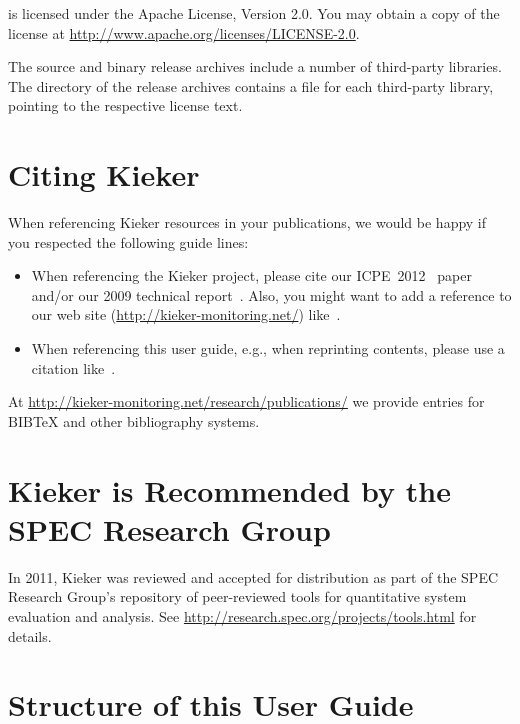 \Kieker{} is licensed under the Apache License, Version 2.0. You may obtain a copy of %
the license at \url{http://www.apache.org/licenses/LICENSE-2.0}.

The \Kieker{} source and binary release archives include a number of third-party %
libraries. %
The  directory of the release archives contains a %
 file for each third-party library, pointing to the respective license text.

\section{Citing Kieker}\label{sec:ch1:citingKieker}

When referencing Kieker resources in your publications, we would be happy if you %
respected the following guide lines:

\begin{itemize}
\item When referencing the Kieker project, please cite our %
ICPE~2012~\cite{KiekerICPE2012} paper and/or our 2009 technical report~\cite{vanHoornRohrHasselbringWallerEhlersFreyKieselhorst2009TRContinuousMonitoringOfSoftwareServicesDesignAndApplicationOfTheKiekerFramework}. %
Also, you might want to add a reference to our web site (\url{http://kieker-monitoring.net/}) %
like~\cite{KiekerWebSite}. 
\item When referencing this user guide, e.g., when reprinting contents, please %
use a citation like~\cite{Kieker1.7UserGuide}.
\end{itemize}

\noindent At \url{http://kieker-monitoring.net/research/publications/} we provide %
entries for $\mathrm{B\scriptstyle IB}\!$\TeX{} and other bibliography %
systems.

\section{Kieker is Recommended by the SPEC Research Group}

In 2011, Kieker was reviewed and accepted for distribution as part of the SPEC Research %
Group's repository of peer-reviewed tools for quantitative system evaluation and analysis. %
See \url{http://research.spec.org/projects/tools.html} for details.

\section{Structure of this User Guide}

